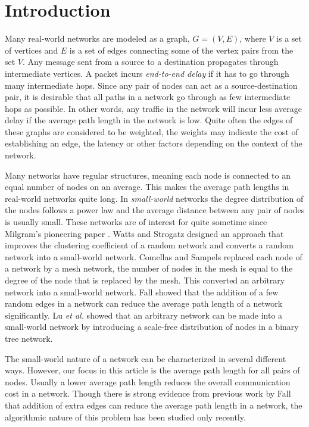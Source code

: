 \documentclass[journal,final,twocolumn,10pt,twoside]{IEEEtranTCOM}
\begin{document}
\section{Introduction}
Many real-world networks are modeled as a graph, $G=(V,E)$, where $V$ is a set of vertices  
and $E$ is a set of edges connecting some of the vertex pairs from the set $V$. Any message sent 
from a source to a destination propagates through intermediate vertices.  
A packet incurs {\em end-to-end delay} if it has to go through many 
intermediate hops. Since any pair of nodes can act as a source-destination pair, it is desirable 
that all paths in a network go through as few intermediate hops as possible. In other words, 
any traffic in the network will incur less average delay if the average path length 
in the network is low. Quite often the edges of these graphs are considered to be weighted, 
the weights may indicate the cost of establishing an edge, the latency or other factors 
depending on the context of the network.  

Many networks have regular structures, meaning each node is connected to an equal number 
of nodes on an average. This makes the average path lengths in real-world networks quite long. 
In {\em small-world} networks the degree distribution of the nodes follows a power law 
and the average distance between any pair of nodes is usually small. These networks are of  
interest for quite sometime since Milgram's pioneering paper \cite{M}. Watts and Strogatz \cite{WS}
designed an approach that improves the clustering coefficient of a random network and converts 
a random network into a small-world network. Comellas and Sampels \cite{CS} replaced each node of a 
network by a mesh network, the number of nodes in the mesh is equal to the 
degree of the node that is replaced
by the mesh. This converted an arbitrary network into a small-world network. Fall \cite{F} showed that 
the addition of a few random edges in a network can reduce the average path length of a network 
significantly. Lu {\em et al.} \cite{LSG} showed that an arbitrary network can be made into a 
small-world network by introducing a scale-free distribution of nodes in a binary tree network.
 

The small-world nature of a network can be characterized in several different ways. 
However, our focus in this article is the average path length for all pairs of nodes.  
Usually a lower average 
path length reduces the overall communication cost in a network. 
Though there is strong evidence from previous work by Fall ~\cite{F} that addition of extra 
edges can reduce the average path length in a network, the algorithmic nature of this problem 
has been studied only recently. 
\end{document}
